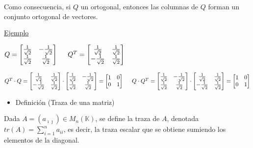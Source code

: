 \documentclass[12pt]{article}
\begin{document}
Como consecuencia, si $Q$ un ortogonal, entonces las columnas de
$Q$ forman un conjunto ortogonal de vectores.

\underline{Ejemplo}

$Q=\begin{bmatrix}
\textstyle\frac{1}{\sqrt{2}} & \textstyle-\frac{1}{\sqrt{2}} \\\textstyle\frac{1}{\sqrt{2}} & \textstyle\frac{1}{\sqrt{2}}
\end{bmatrix}\hspace{0.5cm}Q^T=\begin{bmatrix}
\textstyle\frac{1}{\sqrt{2}}  & \textstyle\frac{1}{\sqrt{2}} \\\textstyle-\frac{1}{\sqrt{2}} & \textstyle\frac{1}{\sqrt{2}}    \end{bmatrix}$

$Q^T\cdot Q=\begin{bmatrix}
\textstyle\frac{1}{\sqrt{2}}  & \textstyle\frac{1}{\sqrt{2}} \\\textstyle-\frac{1}{\sqrt{2}} & \textstyle\frac{1}{\sqrt{2}}\end{bmatrix}\cdot\begin{bmatrix}
\textstyle\frac{1}{\sqrt{2}} & \textstyle-\frac{1}{\sqrt{2}} \\    \textstyle\frac{1}{\sqrt{2}} & \textstyle\frac{1}{\sqrt{2}}
\end{bmatrix}=\begin{bmatrix}
    1 & 0\\
    0 & 1
\end{bmatrix}\hspace{0.5cm}Q\cdot Q^T=\begin{bmatrix}
\textstyle\frac{1}{\sqrt{2}} & \textstyle-\frac{1}{\sqrt{2}} \\    \textstyle\frac{1}{\sqrt{2}} & \textstyle\frac{1}{\sqrt{2}}
\end{bmatrix}\cdot\begin{bmatrix}
\textstyle\frac{1}{\sqrt{2}}  & \textstyle\frac{1}{\sqrt{2}} \\\textstyle-\frac{1}{\sqrt{2}} & \textstyle\frac{1}{\sqrt{2}}\end{bmatrix}=\begin{bmatrix}
    1 & 0\\
    0 & 1
\end{bmatrix}$

\begin{itemize}[label=\color{red}\textbullet, leftmargin=*]
    \item \color{lightblue} Definición (Traza de una matriz)
\end{itemize}
Dada $A=(a_{\imath\jmath  })\in M_n(\mathbb{K})$, se define la traza de $A$,
denotada $tr(A)=\sum_{i=1}^{n}a_{ii}$, es decir, la traza
escalar que se obtiene sumiendo los elementos de la diagonal.
\end{document}

